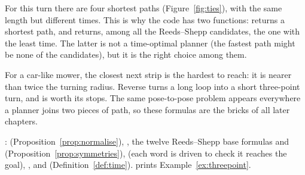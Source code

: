 For this turn there are four shortest paths (Figure~\ref{fig:ties}), with the
same length but different times. This is why the code has two functions:
 returns a shortest path, and  returns, among
all the Reeds--Shepp candidates, the one with the least time. The latter is
not a time-optimal planner (the fastest path might be none of the
candidates), but it is the right choice among them.

\begin{inwords}
  For a car-like mower, the closest next strip is the hardest to reach: it
  is nearer than twice the turning radius. Reverse turns a long loop into a
  short three-point turn, and is worth its stops. The same pose-to-pose
  problem appears everywhere a planner joins two pieces of path, so these
  formulas are the bricks of all later chapters.
\end{inwords}

\begin{incode}
  :  (Proposition~\ref{prop:normalise}),
  , the twelve Reeds--Shepp base formulas and
   (Proposition~\ref{prop:symmetries}),
   (each word is driven to check it reaches the goal),
  ,  and 
  (Definition~\ref{def:time}).  prints Example~\ref{ex:threepoint}.
\end{incode}

